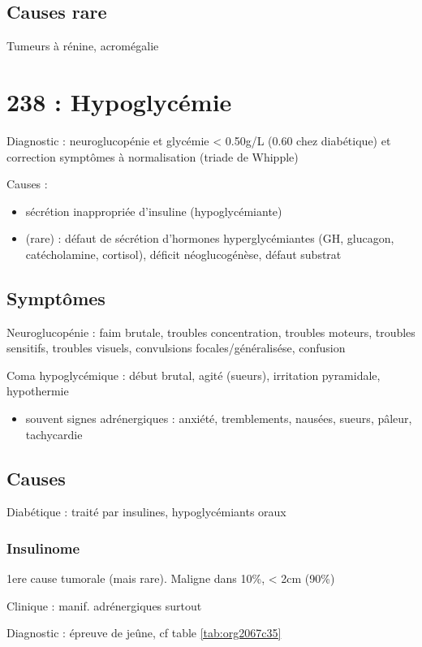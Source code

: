 \documentclass[11pt]{article}
\begin{document}
\subsection{Causes rare}
\label{sec:org3536690}
Tumeurs à rénine, acromégalie
\section{238 : Hypoglycémie}
\label{sec:org3ab2e4d}
Diagnostic : neuroglucopénie et glycémie < 0.50g/L (0.60 chez diabétique) et correction symptômes
à normalisation (triade de Whipple)

Causes :
\begin{itemize}
\item sécrétion inappropriée d'insuline (hypoglycémiante)
\item (rare) : défaut de sécrétion d'hormones hyperglycémiantes (GH, glucagon,
catécholamine, cortisol), déficit néoglucogénèse, défaut substrat
\end{itemize}

\subsection{Symptômes}
\label{sec:orgc724473}
Neuroglucopénie : faim brutale, troubles concentration, troubles moteurs,
troubles sensitifs, troubles visuels, convulsions focales/généralisése,
confusion

Coma hypoglycémique : début brutal, agité (sueurs), irritation pyramidale, hypothermie

\begin{itemize}
\item souvent signes adrénergiques : anxiété, tremblements, nausées, sueurs,
pâleur, tachycardie
\end{itemize}

\subsection{Causes}
\label{sec:org2c1411b}
Diabétique : traité par insulines, hypoglycémiants oraux

\subsubsection{Insulinome}
\label{sec:org976588b}
1ere cause tumorale (mais rare). Maligne dans 10\%, < 2cm (90\%)

Clinique : manif. adrénergiques surtout

Diagnostic : épreuve de jeûne, cf table \ref{tab:org2067c35}
\end{document}
